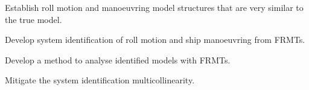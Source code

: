 \vspace{0.2cm}
\begin{tcolorbox}[sharp corners,title=Objective]
\objective

    \begin{tcolorbox}[sharp corners,title=RO1]
    Establish roll motion and manoeuvring model structures that are very similar to the true model.
    \end{tcolorbox}
    \begin{tcolorbox}[sharp corners,title=RO2]
    Develop system identification of roll motion and ship manoeuvring from FRMTs.
    \end{tcolorbox}
    \begin{tcolorbox}[sharp corners,title=RO3]
    Develop a method to analyse identified models with FRMTs.
    \end{tcolorbox}
    \begin{tcolorbox}[sharp corners,title=RO4]
    Mitigate the system identification multicollinearity.
    \end{tcolorbox}

\end{tcolorbox}
\vspace{0.3cm}
%


